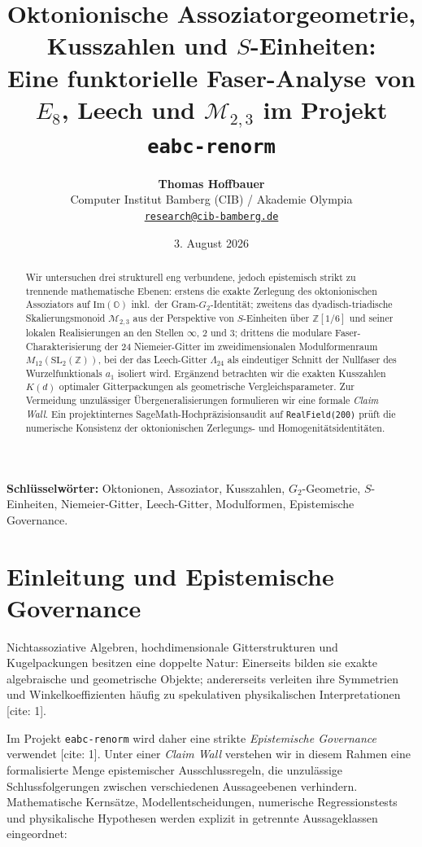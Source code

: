 \documentclass[11pt,a4paper]{article}
\title{\textbf{Oktonionische Assoziatorgeometrie, Kusszahlen und $S$-Einheiten:}\\[0.5em]
	\Large Eine funktorielle Faser-Analyse von $E_8$, Leech und $\mathcal{M}_{2,3}$ im Projekt \texttt{eabc-renorm}}
\author{\textbf{Thomas Hoffbauer}\\
	\small Computer Institut Bamberg (CIB) / Akademie Olympia\\
	\small \href{mailto:research@cib-bamberg.de}{\texttt{research@cib-bamberg.de}}}
\date{3. August 2026}
\newcommand{\ImO}{\mathrm{Im}(\mathbb{O})}
\begin{document}
	
	\maketitle
	
	\begin{abstract}
		Wir untersuchen drei strukturell eng verbundene, jedoch epistemisch strikt zu trennende mathematische Ebenen: erstens die exakte Zerlegung des oktonionischen Assoziators auf $\ImO$ inkl.\ der Gram-$G_2$-Identität; zweitens das dyadisch-triadische Skalierungsmonoid $\mathcal{M}_{2,3}$ aus der Perspektive von $S$-Einheiten über $\mathbb{Z}[1/6]$ und seiner lokalen Realisierungen an den Stellen $\infty$, $2$ und $3$; drittens die modulare Faser-Charakterisierung der 24 Niemeier-Gitter im zweidimensionalen Modulformenraum $M_{12}(\mathrm{SL}_2(\mathbb{Z}))$, bei der das Leech-Gitter $\Lambda_{24}$ als eindeutiger Schnitt der Nullfaser des Wurzelfunktionals $a_1$ isoliert wird. Ergänzend betrachten wir die exakten Kusszahlen $K(d)$ optimaler Gitterpackungen als geometrische Vergleichsparameter. Zur Vermeidung unzulässiger Übergeneralisierungen formulieren wir eine formale \emph{Claim Wall}. Ein projektinternes SageMath-Hochpräzisionsaudit auf \texttt{RealField(200)} prüft die numerische Konsistenz der oktonionischen Zerlegungs- und Homogenitätsidentitäten.
	\end{abstract}
	
	\noindent\textbf{Schlüsselwörter:} Oktonionen, Assoziator, Kusszahlen, $G_2$-Geometrie, $S$-Einheiten, Niemeier-Gitter, Leech-Gitter, Modulformen, Epistemische Governance.
	
	\tableofcontents
	\newpage
	
	\section{Einleitung und Epistemische Governance}
	
	Nichtassoziative Algebren, hochdimensionale Gitterstrukturen und Kugelpackungen besitzen eine doppelte Natur: Einerseits bilden sie exakte algebraische und geometrische Objekte; andererseits verleiten ihre Symmetrien und Winkelkoeffizienten häufig zu spekulativen physikalischen Interpretationen \cite{schafer, baez}[cite: 1]. 
	
	Im Projekt \texttt{eabc-renorm} wird daher eine strikte \emph{Epistemische Governance} verwendet \cite{eabcAudit}[cite: 1]. Unter einer \emph{Claim Wall} verstehen wir in diesem Rahmen eine formalisierte Menge epistemischer Ausschlussregeln, die unzulässige Schlussfolgerungen zwischen verschiedenen Aussageebenen verhindern. Mathematische Kernsätze, Modellentscheidungen, numerische Regressionstests und physikalische Hypothesen werden explizit in getrennte Aussageklassen eingeordnet:
	
\end{document}
